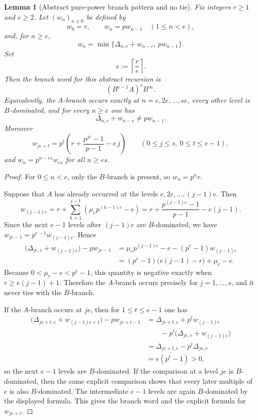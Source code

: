 \documentclass[11pt]{amsart}
\numberwithin{equation}{section}
\newtheorem{lemma}[lemma]{Lemma}
\begin{document}
\begin{lemma}[Abstract pure-power branch pattern and no tie]
\label{lem:abstract-branch-pe}
Fix integers $r\ge1$ and $e\ge2$.  Let $(w_n)_{n\ge0}$ be defined by
\[
        w_0=r,
        \qquad
        w_n=pw_{n-1}\quad(1\le n<e),
\]
and, for $n\ge e$,
\[
        w_n=\min\{\Delta_{n,e}+w_{n-e},\,p w_{n-1}\}.
\]
Set
\[
        s:=\left\lceil\frac r e\right\rceil.
\]
Then the branch word for this abstract recursion is
\[
        (B^{e-1}A)^sB^\infty.
\]
Equivalently, the $A$-branch occurs exactly at $n=e,2e,\ldots,se$, every other level is $B$-dominated, and for every $n\ge e$ one has
\[
        \Delta_{n,e}+w_{n-e}\ne p w_{n-1}.
\]
Moreover
\[
        w_{je+t}=p^t\left(r+\frac{p^{j e}-1}{p-1}-e\,j\right)
        \qquad(0\le j\le s,\ 0\le t\le e-1),
\]
and $w_n=p^{n-e s}w_{e s}$ for all $n\ge e s$.
\end{lemma}
\begin{proof}
For $0\le n<e$, only the $B$-branch is present, so $w_n=p^nr$.

Suppose that $A$ has already occurred at the levels $e,2e,\ldots,(j-1)e$.  Then
\[
        w_{(j-1)e}
        =r+\sum_{h=1}^{j-1}(\mu_ep^{(h-1)e}-e)
        =r+\frac{p^{(j-1)e}-1}{p-1}-e(j-1).
\]
Since the next $e-1$ levels after $(j-1)e$ are $B$-dominated, we have $w_{je-1}=p^{e-1}w_{(j-1)e}$.  Hence
\[
\begin{aligned}
        \bigl(\Delta_{je,e}+w_{(j-1)e}\bigr)-p w_{je-1}
        &=\mu_ep^{(j-1)e}-e-(p^e-1)w_{(j-1)e}\\
        &=(p^e-1)\bigl(e(j-1)-r\bigr)+\mu_e-e.
\end{aligned}
\]
Because $0<\mu_e-e<p^e-1$, this quantity is negative exactly when $r\ge e(j-1)+1$.  Therefore the $A$-branch occurs precisely for $j=1,\ldots,s$, and it never ties with the $B$-branch.

If the $A$-branch occurs at $je$, then for $1\le t\le e-1$ one has
\[
\begin{aligned}
        \bigl(\Delta_{je+t,e}+w_{(j-1)e+t}\bigr)-p w_{je+t-1}
        &=\Delta_{je+t,e}+p^t w_{(j-1)e}\\
        &\qquad -p^t\bigl(\Delta_{je,e}+w_{(j-1)e}\bigr)\\
        &=\Delta_{je+t,e}-p^t\Delta_{je,e}\\
        &=e(p^t-1)>0,
\end{aligned}
\]
so the next $e-1$ levels are $B$-dominated.  If the comparison at a level $je$ is $B$-dominated, then the same explicit comparison shows that every later multiple of $e$ is also $B$-dominated.  The intermediate $e-1$ levels are again $B$-dominated by the displayed formula.  This gives the branch word and the explicit formula for $w_{je+t}$.
\end{proof}
\end{document}
